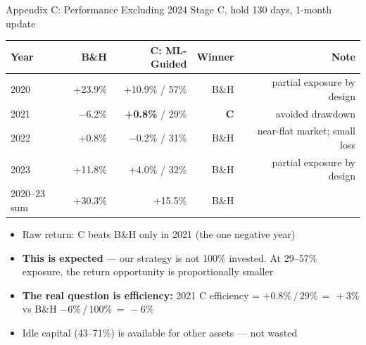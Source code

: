 \documentclass[aspectratio=169]{beamer}
\begin{document}
\begin{frame}{Appendix C: Performance Excluding 2024}
  \small
  Stage C, hold 130 days, 1-month update

  \vspace{0.4em}
  \begin{tabular}{lrrrr}
    \toprule
    Year & B\&H & C: ML-Guided & Winner & Note \\
    \midrule
    2020 & +23.9\% & +10.9\% / 57\% & B\&H & partial exposure by design \\
    2021 & $-$6.2\%  & \textbf{+0.8\%} / 29\% & \textbf{C} & avoided drawdown \\
    2022 & +0.8\%  & $-$0.2\% / 31\% & B\&H & near-flat market; small loss \\
    2023 & +11.8\% & +4.0\% / 32\% & B\&H & partial exposure by design \\
    \midrule
    2020--23 sum & +30.3\% & +15.5\% & B\&H & \\
    \bottomrule
  \end{tabular}

  \vspace{0.5em}
  \begin{itemize}
    \item Raw return: C beats B\&H only in 2021 (the one negative year)
    \item \textbf{This is expected} — our strategy is not 100\% invested.
          At 29--57\% exposure, the return opportunity is proportionally smaller
    \item \textbf{The real question is efficiency:}
          2021 C efficiency = $+0.8\%\,/\,29\%\,=\,+3\%$ vs B\&H $-6\%\,/\,100\%\,=\,-6\%$
    \item Idle capital (43--71\%) is available for other assets — not wasted
  \end{itemize}
\end{frame}
\end{document}
